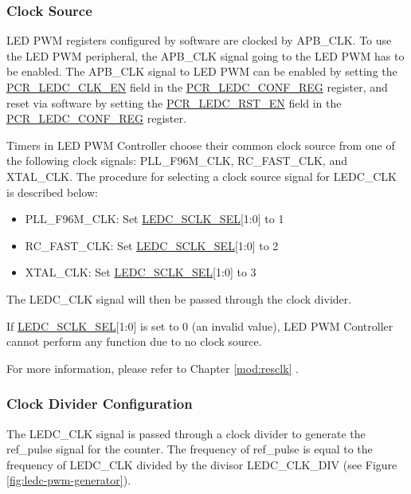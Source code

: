 \documentclass[main\_\_EN.tex]{subfiles}
\begin{document}
\subsubsection{Clock Source}

LED PWM registers configured by software are clocked by APB\_CLK. To use the LED PWM peripheral, the APB\_CLK signal going to the LED PWM has to be enabled. The APB\_CLK signal to LED PWM can be enabled by setting the \hyperref[fielddesc:PCRLEDCCLKEN]{PCR\_LEDC\_CLK\_EN} field in the \hyperref[regdesc:PCRLEDCCONFREG]{PCR\_LEDC\_CONF\_REG} register, and reset via software by setting the \hyperref[fielddesc:PCRLEDCRSTEN]{PCR\_LEDC\_RST\_EN} field in the \hyperref[regdesc:PCRLEDCCONFREG]{PCR\_LEDC\_CONF\_REG} register.

Timers in LED PWM Controller choose their common clock source from one of the following clock signals: PLL\_F96M\_CLK, RC\_FAST\_CLK, and XTAL\_CLK. The procedure for selecting a clock source signal for LEDC\_CLK is described below:

\begin{itemize}
    \item PLL\_F96M\_CLK: Set \hyperref[fielddesc:LEDCSCLKSEL]{LEDC\_SCLK\_SEL}[1:0] to 1
    \item RC\_FAST\_CLK: Set \hyperref[fielddesc:LEDCSCLKSEL]{LEDC\_SCLK\_SEL}[1:0] to 2
    \item XTAL\_CLK: Set \hyperref[fielddesc:LEDCSCLKSEL]{LEDC\_SCLK\_SEL}[1:0] to 3

\end{itemize}

The LEDC\_CLK signal will then be passed through the clock divider.

If \hyperref[fielddesc:LEDCSCLKSEL]{LEDC\_SCLK\_SEL}[1:0] is set to 0 (an invalid value), LED PWM Controller cannot perform any function due to no clock source.

For more information, please refer to Chapter \ref{mod:resclk} \textit{}.

\subsubsection{Clock Divider Configuration}

The LEDC\_CLK signal is passed through a clock divider to generate the ref\_pulse signal for the counter. The frequency of ref\_pulse is equal to the frequency of LEDC\_CLK divided by the divisor LEDC\_CLK\_DIV (see Figure \ref{fig:ledc-pwm-generator}).
\end{document}
